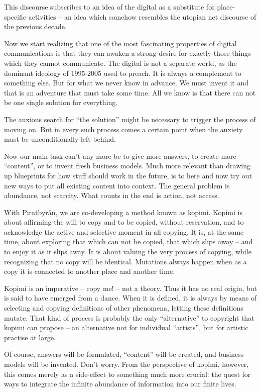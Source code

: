 This discourse subscribes to an idea of the digital as a substitute for
place-specif\hbox{}ic activities – an idea which somehow resembles the utopian
net discourse of the previous decade.

Now we start realizing that one of the most fascinating properties of digital
communications is that they can awaken a strong desire for exactly those things
which they cannot communicate. The digital is not a separate world, as the
dominant ideology of 1995-2005 used to preach. It is always a complement to
something else. But for what we never know in advance. We must invent it and
that is an adventure that must take some time. All we know is that there can not
be one single solution for everything.

The anxious search for ``the solution'' might be necessary to trigger the
process of moving on. But in every such process comes a certain point when the
anxiety must be unconditionally left behind.

Now our main task can't any more be to give more answers, to create more
``content'', or to invent fresh business models. Much more relevant than drawing
up blueprints for how stuf\hbox{}f should work in the future, is to here and now
try out new ways to put all existing content into context. The general problem
is abundance, not scarcity. What counts in the end is action, not access.

With Piratbyrån, we are co-developing a method known as kopimi. Kopimi is about
af\hbox{}f\hbox{}irming the will to copy and to be copied, without reservation,
and to acknowledge the active and selective moment in all copying. It is, at the
same time, about exploring that which can not be copied, that which slips away –
and to enjoy it as it slips away. It is about valuing the very process of
copying, while recognizing that no copy will be identical. Mutations always
happen when as a copy it is connected to another place and another time.

Kopimi is an imperative – copy me! – not a theory. Thus it has no real origin,
but is said to have emerged from a dance. When it is def\hbox{}ined, it is
always by means of selecting and copying def\hbox{}initions of other phenomena,
letting these def\hbox{}initions mutate. That kind of process is probably the
only ``alternative'' to copyright that kopimi can propose – an alternative not
for individual ``artists'', but for artistic practise at large.

Of course, answers will be formulated, ``content'' will be created, and business
models will be invented. Don't worry. From the perspective of kopimi, however,
this comes merely as a side-ef\hbox{}fect to something much more crucial: the
quest for ways to integrate the inf\hbox{}inite abundance of information into
our f\hbox{}inite lives.
